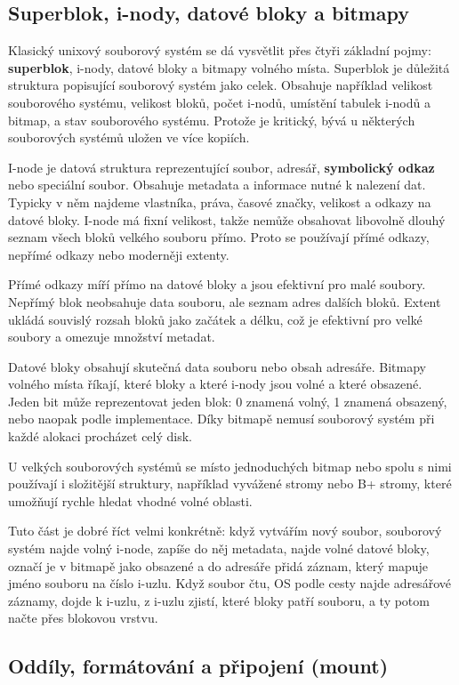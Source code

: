 \subsection*{Superblok, i-nody, datové bloky a bitmapy}

Klasický unixový souborový systém se dá vysvětlit přes čtyři základní pojmy: \textbf{superblok}, i-nody, datové bloky a bitmapy volného místa. Superblok je důležitá struktura popisující souborový systém jako celek. Obsahuje například velikost souborového systému, velikost bloků, počet i-nodů, umístění tabulek i-nodů a bitmap, a stav souborového systému. Protože je kritický, bývá u některých souborových systémů uložen ve více kopiích.

I-node je datová struktura reprezentující soubor, adresář, \textbf{symbolický odkaz} nebo speciální soubor. Obsahuje metadata a informace nutné k nalezení dat. Typicky v něm najdeme vlastníka, práva, časové značky, velikost a odkazy na datové bloky. I-node má fixní velikost, takže nemůže obsahovat libovolně dlouhý seznam všech bloků velkého souboru přímo. Proto se používají přímé odkazy, nepřímé odkazy nebo moderněji extenty.

Přímé odkazy míří přímo na datové bloky a jsou efektivní pro malé soubory. Nepřímý blok neobsahuje data souboru, ale seznam adres dalších bloků. Extent ukládá souvislý rozsah bloků jako začátek a délku, což je efektivní pro velké soubory a omezuje množství metadat.

Datové bloky obsahují skutečná data souboru nebo obsah adresáře. Bitmapy volného místa říkají, které bloky a které i-nody jsou volné a které obsazené. Jeden bit může reprezentovat jeden blok: 0 znamená volný, 1 znamená obsazený, nebo naopak podle implementace. Díky bitmapě nemusí souborový systém při každé alokaci procházet celý disk.

U velkých souborových systémů se místo jednoduchých bitmap nebo spolu s nimi používají i složitější struktury, například vyvážené stromy nebo B+ stromy, které umožňují rychle hledat vhodné volné oblasti.

Tuto část je dobré říct velmi konkrétně: když vytvářím nový soubor, souborový systém najde volný i-node, zapíše do něj metadata, najde volné datové bloky, označí je v bitmapě jako obsazené a do adresáře přidá záznam, který mapuje jméno souboru na číslo i-uzlu. Když soubor čtu, OS podle cesty najde adresářové záznamy, dojde k i-uzlu, z i-uzlu zjistí, které bloky patří souboru, a ty potom načte přes blokovou vrstvu.

\subsection*{Oddíly, formátování a připojení (mount)}


